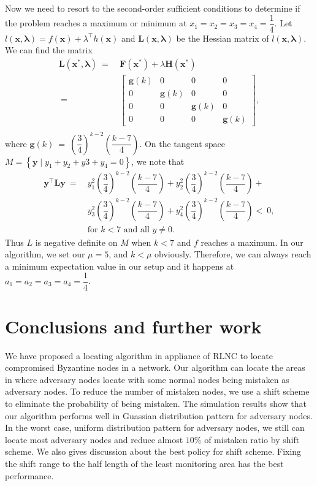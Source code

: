 \documentclass[conference]{IEEEtran}
\newenvironment{proof}[1][Proof]{\begin{trivlist}
\item[\hskip \labelsep {\bfseries #1}]}{\end{trivlist}}
\begin{document}
\begin{proof}
Now we need to resort to the second-order sufficient conditions to determine if the problem reaches a maximum or minimum at $x_1=x_2=x_3=x_4=\dfrac{1}{4}$. Let $l(\mathbf{x},\mathbf{\lambda})=f(\mathbf{x})+\lambda^{\top}h(\mathbf{x})$ and $\mathbf{L(x,\lambda)}$ be the Hessian matrix of $l(\mathbf{x,\lambda})$. We can find the matrix 
\begin{subequations}
\begin{align*}
\mathbf{L(x^{\ast},\lambda)}~=&~ \mathbf{F(x^{\ast})}+\lambda \mathbf{H(x^{\ast})} \\~=&~
\begin{bmatrix}                \mathbf{g}(k) & 0 & 0 & 0 \\
  0 & \mathbf{g}(k) & 0 & 0 \\
  0 & 0 & \mathbf{g}(k) & 0 \\
  0 & 0 & 0 & \mathbf{g}(k) 
\end{bmatrix}, \\
\end{align*}
\end{subequations}
where $\mathbf{g}(k)~=~(\dfrac{3}{4})^{k-2}(\dfrac{k-7}{4})$. On the tangent space $M=\left\{\mathbf{y}\mid y_1+y_2+y3+y_4=0\right\}$, we note that 
\begin{subequations}
\begin{align*}
\mathbf{y^{\top}Ly}~=&~y_1^2(\dfrac{3}{4})^{k-2}(\dfrac{k-7}{4}) +y_2^2(\dfrac{3}{4})^{k-2}(\dfrac{k-7}{4}) + \\
&~y_3^2(\dfrac{3}{4})^{k-2}(\dfrac{k-7}{4}) +y_4^2(\dfrac{3}{4})^{k-2}(\dfrac{k-7}{4}) 
<~0,\\
&~\mbox{for $k<7$ and all $y\neq0$}.
\end{align*}
\end{subequations}
Thus $L$ is negative definite on $M$ when $k<7$ and $f$ reaches a maximum. In our algorithm, we set our $\mu=5$, and $k<\mu$ obviously. Therefore, we can always reach a minimum expectation value in our setup and it happens at $a_1=a_2=a_3=a_4=\dfrac{1}{4}$.


\end{proof}

\section{Conclusions and further work}
We have proposed a locating algorithm in appliance of RLNC to locate compromised Byzantine nodes in a network. Our algorithm can locate the areas in where adversary nodes locate with some normal nodes being mistaken as adversary nodes. To reduce the number of mistaken nodes, we use a shift scheme to eliminate the probability of being mistaken. The simulation results show that our algorithm performs well in Guassian distribution pattern for adversary nodes. In the worst case, uniform distribution pattern for adversary nodes, we still can locate most adversary nodes and reduce almost $10\%$ of mistaken ratio by shift scheme. We also gives discussion about the best policy for shift scheme. Fixing the shift range to the half length of the least monitoring area has the best performance.
\end{document}
